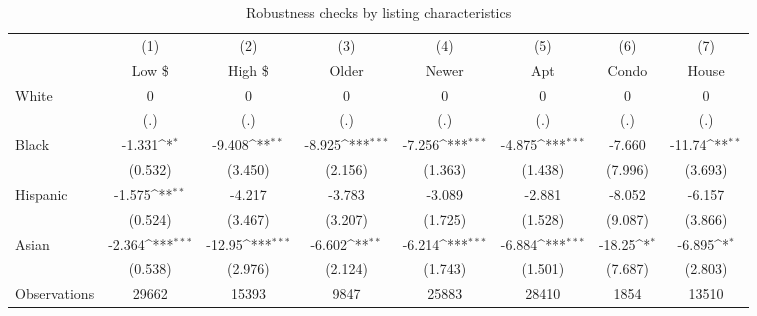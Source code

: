 {
\def\sym#1{\ifmmode^{#1}\else\(^{#1}\)\fi}
\begin{longtable}{l*{7}{c}}
\caption{Robustness checks by listing characteristics}\\
\hline\hline\endfirsthead\hline\endhead\hline\endfoot\endlastfoot
                    &\multicolumn{1}{c}{(1)}&\multicolumn{1}{c}{(2)}&\multicolumn{1}{c}{(3)}&\multicolumn{1}{c}{(4)}&\multicolumn{1}{c}{(5)}&\multicolumn{1}{c}{(6)}&\multicolumn{1}{c}{(7)}\\
                    &\multicolumn{1}{c}{Low \$}&\multicolumn{1}{c}{High \$}&\multicolumn{1}{c}{Older}&\multicolumn{1}{c}{Newer}&\multicolumn{1}{c}{Apt}&\multicolumn{1}{c}{Condo}&\multicolumn{1}{c}{House}\\
\hline
White               &           0         &           0         &           0         &           0         &           0         &           0         &           0         \\
                    &         (.)         &         (.)         &         (.)         &         (.)         &         (.)         &         (.)         &         (.)         \\
[1em]
Black               &      -1.331\sym{*}  &      -9.408\sym{**} &      -8.925\sym{***}&      -7.256\sym{***}&      -4.875\sym{***}&      -7.660         &      -11.74\sym{**} \\
                    &     (0.532)         &     (3.450)         &     (2.156)         &     (1.363)         &     (1.438)         &     (7.996)         &     (3.693)         \\
[1em]
Hispanic            &      -1.575\sym{**} &      -4.217         &      -3.783         &      -3.089         &      -2.881         &      -8.052         &      -6.157         \\
                    &     (0.524)         &     (3.467)         &     (3.207)         &     (1.725)         &     (1.528)         &     (9.087)         &     (3.866)         \\
[1em]
Asian               &      -2.364\sym{***}&      -12.95\sym{***}&      -6.602\sym{**} &      -6.214\sym{***}&      -6.884\sym{***}&      -18.25\sym{*}  &      -6.895\sym{*}  \\
                    &     (0.538)         &     (2.976)         &     (2.124)         &     (1.743)         &     (1.501)         &     (7.687)         &     (2.803)         \\
\hline
Observations        &       29662         &       15393         &        9847         &       25883         &       28410         &        1854         &       13510         \\

\end{longtable}}
